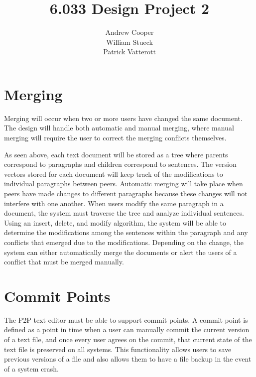 \documentclass{6033dp1/6033dp1}
\title{6.033 Design Project 2}
\author{Andrew Cooper\\ William Stueck\\ Patrick Vatterott}
\begin{document}
\maketitle




\section{Merging}
Merging will occur when two or more users have changed the same document. The design will handle both automatic and manual merging, where manual merging will require the user to correct the merging conflicts themselves.

As seen above, each text document will be stored as a tree where parents correspond to paragraphs and children correspond to sentences. The version vectors stored for each document will keep track of the modifications to individual paragraphs between peers. Automatic merging will take place when peers have made changes to different paragraphs because these changes will not interfere with one another. When users modify the same paragraph in a document, the system must traverse the tree and analyze individual sentences. Using an insert, delete, and modify algorithm, the system will be able to determine the modifications among the sentences within the paragraph and any conflicts that emerged due to the modifications. Depending on the change, the system can either automatically merge the documents or alert the users of a conflict that must be merged manually.

\section{Commit Points}
The P2P text editor must be able to support commit points. A commit point is defined as a point in time when a user can manually commit the current version of a text file, and once every user agrees on the commit, that current state of the text file is preserved on all systems.  This functionality allows users to save previous versions of a file and also allows them to have a file backup in the event of a system crash.
\end{document}
